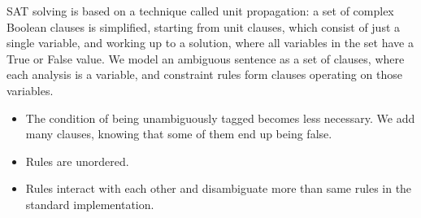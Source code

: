 \documentclass[11pt]{article}
\begin{document}
SAT solving is based on a technique called unit propagation:
a set of complex Boolean clauses is simplified, starting from unit
clauses, which consist of just a single variable, and working up to a
solution, where all variables in the set have a True or False value.
We model an ambiguous sentence as a set of clauses, where each analysis is a variable, 
and constraint rules form clauses operating on those variables.

\begin{itemize}
\item The condition of being unambiguously tagged becomes less necessary.
We add many clauses, knowing that some of them end up being false.
\item Rules are unordered. 
\item Rules interact with each other and disambiguate more than same rules in the standard implementation.
\end{itemize}





\end{document}

